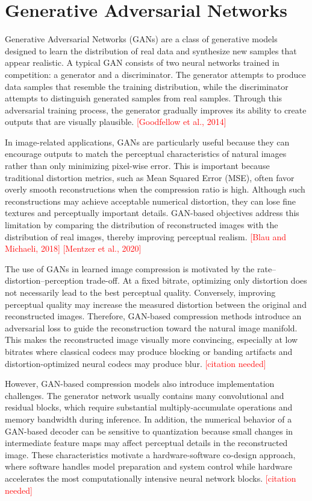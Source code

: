 \documentclass[11pt]{report}
\begin{document}
\section{Generative Adversarial Networks}

Generative Adversarial Networks (GANs) are a class of generative models designed to learn the distribution of real data and synthesize new samples that appear realistic. A typical GAN consists of two neural networks trained in competition: a generator and a discriminator. The generator attempts to produce data samples that resemble the training distribution, while the discriminator attempts to distinguish generated samples from real samples. Through this adversarial training process, the generator gradually improves its ability to create outputs that are visually plausible. \textcolor{red}{[Goodfellow et al., 2014]}

In image-related applications, GANs are particularly useful because they can encourage outputs to match the perceptual characteristics of natural images rather than only minimizing pixel-wise error. This is important because traditional distortion metrics, such as Mean Squared Error (MSE), often favor overly smooth reconstructions when the compression ratio is high. Although such reconstructions may achieve acceptable numerical distortion, they can lose fine textures and perceptually important details. GAN-based objectives address this limitation by comparing the distribution of reconstructed images with the distribution of real images, thereby improving perceptual realism. \textcolor{red}{[Blau and Michaeli, 2018]} \textcolor{red}{[Mentzer et al., 2020]}

The use of GANs in learned image compression is motivated by the rate--distortion--perception trade-off. At a fixed bitrate, optimizing only distortion does not necessarily lead to the best perceptual quality. Conversely, improving perceptual quality may increase the measured distortion between the original and reconstructed images. Therefore, GAN-based compression methods introduce an adversarial loss to guide the reconstruction toward the natural image manifold. This makes the reconstructed image visually more convincing, especially at low bitrates where classical codecs may produce blocking or banding artifacts and distortion-optimized neural codecs may produce blur. \textcolor{red}{[citation needed]}

However, GAN-based compression models also introduce implementation challenges. The generator network usually contains many convolutional and residual blocks, which require substantial multiply-accumulate operations and memory bandwidth during inference. In addition, the numerical behavior of a GAN-based decoder can be sensitive to quantization because small changes in intermediate feature maps may affect perceptual details in the reconstructed image. These characteristics motivate a hardware-software co-design approach, where software handles model preparation and system control while hardware accelerates the most computationally intensive neural network blocks. \textcolor{red}{[citation needed]}
\end{document}
